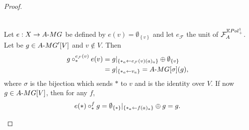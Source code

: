 \documentclass[11pt]{article}
\theoremstyle{definition}
\numberwithin{equation}{section}
\newcommand{\take}{\leftarrow}
\newcommand{\set}[1]{\left\{#1\right\}}
\newcommand{\spe}[1]{\normalfont{\textsc{#1}}}
\newcommand{\K}{\mathbb{K}}
\newcommand{\comp}[1][\ast]{\circ_{#1}}
\newcommand{\MG}{\spe{MG}}
\newcommand{\Poly}{\spe{Pol}_+}
\newcommand{\augm}[2]{#1\text{-}#2}
\newcommand{\func}[2]{\mathcal{F}_{#1}^{#2}}
\begin{document}
\begin{proof}
\begin{description}
\begin{equation}
\begin{split}
        \end{split}\end{equation}
        \item[Unity.] Let $e: \spe{X}\to \augm{A}{\MG}$ be defined by $e(v) = \emptyset_{\set{v}}$ and 
        let $e_{\mathcal{F}}$ the unit of $\func{A}{\K\Poly^1}$. Let be $g\in\augm{A}{\MG}'[V]$ and 
        $v\not\in V$. Then
        \begin{equation}\begin{split}
            g\comp^{e_{\mathcal{F}}(v)}e(v) 
            &= g|_{\set{\ast_a \take e_{\mathcal{F}}(v)(a)_a}}\oplus\emptyset_{\set{v}} \\
            &= g|_{\set{\ast_a \take v_a}} = \augm{A}{\MG}[\sigma](g),
        \end{split}\end{equation}
        where $\sigma$ is the bijection which sends $\ast$ to $v$ and is the identity over $V$. If now 
        $g\in\augm{A}{\MG}[V]$, then for any $f$,
        \begin{equation}
            e(\ast)\comp^f g = \emptyset_{\set{\ast}}|_{\set{\ast_a \take f(a)_a}}\oplus g = g. \qedhere
        \end{equation}
    \end{description}
\end{proof}
\end{document}
